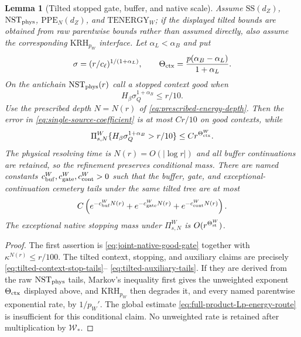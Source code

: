 \documentclass[11pt]{article}
\newtheorem{lemma}[theorem]{Lemma}
\begin{document}
\begin{lemma}[Tilted stopped gate, buffer, and native scale]
\label{lem:gate-buffer}
Assume $\mathrm{SS}(d_Z)$, $\mathrm{NST}_{\rm phys}$,
$\mathrm{PPE}_{N}(d_Z)$, and $\mathrm{TENERGY}_{W}$; if the displayed
tilted bounds are obtained from raw parentwise bounds rather than assumed
directly, also assume the corresponding $\mathrm{KRH}_{p_W}$ interface.
Let $\alpha_L<\alpha_B$ and put
\begin{equation}
\label{eq:native-energy-scale}
 \sigma=(r/c_\ell)^{1/(1+\alpha_L)},\qquad
 \Theta_{\rm ctx}=\frac{p(\alpha_B-\alpha_L)}{1+\alpha_L}.
\end{equation}
On the antichain $\mathrm{NST}_{\rm phys}(r)$ call a stopped context good
when
\begin{equation}
\label{eq:joint-native-good-gate}
 H_\beta\sigma_Q^{1+\alpha_B}\le r/10.
\end{equation}
Use the prescribed depth $N=N(r)$ of
\eqref{eq:prescribed-energy-depth}.  Then the error in
\eqref{eq:single-source-coefficient} is at most $Cr/10$ on good contexts,
while
\begin{equation}
\label{eq:bad-context-native-scale}
 \Pi_{s,N}^{W}
 \{H_\beta\sigma_Q^{1+\alpha_B}>r/10\}
 \le Cr^{\Theta_{\rm ctx}^{W}}.
\end{equation}
The physical resolving time is $N(r)=O(|\log r|)$ and all buffer
continuations are retained, so the refinement preserves conditional mass.
There are named constants
$c_{\rm buf}^{W},c_{\rm gate}^{W},c_{\rm cont}^{W}>0$ such that the
buffer, gate, and exceptional-continuation cemetery tails under the same
tilted tree are at most
\begin{equation}
\label{eq:named-energy-tails}
 C\left(e^{-c_{\rm buf}^{W}N(r)}+e^{-c_{\rm gate}^{W}N(r)}
 +e^{-c_{\rm cont}^{W}N(r)}\right).
\end{equation}
The exceptional native stopping mass under $\Pi_{s,N}^{W}$ is
$O(r^{\Theta_{\rm st}^{W}})$.
\end{lemma}

\begin{proof}
The first assertion is \eqref{eq:joint-native-good-gate} together with
$\kappa^{N(r)}\le r/100$.  The tilted context, stopping, and auxiliary
claims are precisely
\eqref{eq:tilted-context-stop-tails}--
\eqref{eq:tilted-auxiliary-tails}.  If they are derived from the raw
$\mathrm{NST}_{\rm phys}$ tails, Markov's inequality first gives the
unweighted exponent $\Theta_{\rm ctx}$ displayed above, and
$\mathrm{KRH}_{p_W}$ then degrades it, and every named parentwise
exponential rate, by $1/p_W'$.  The global estimate
\eqref{eq:full-product-Lp-energy-route} is insufficient for this conditional
claim.  No unweighted rate is retained after multiplication by
$\mathscr W_*$.
\end{proof}
\end{document}
